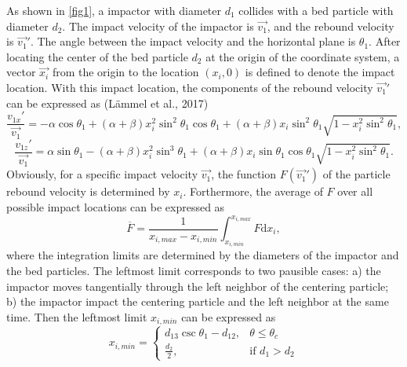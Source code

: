 \documentclass[12pt,a4paper]{article}
\newcommand{\diff}{\mathrm{d}} %
\begin{document}
As shown in \ref{fig1}, a impactor with diameter $d_1$ collides with a bed particle with diameter $d_2$. The impact velocity of the impactor is $\overrightarrow{v_1}$, and the rebound velocity is $\overrightarrow{v_1}'$. The angle between the impact velocity and the horizontal plane is $\theta_1$. After locating the center of the bed particle $d_2$ at the origin of the coordinate system, a vector $\overrightarrow{x_i}$ from the origin to the location $(x_i, 0)$ is defined to denote the impact location. With this impact location, the components of the rebound velocity $\overrightarrow{v_1}'$ can be expressed as (L\"ammel et al., 2017)
\begin{equation}
    \frac{v_{1x}'}{\overrightarrow{v_1}} = - \alpha \cos\theta_1 + (\alpha + \beta) x_i^2 \sin^2\theta_1\cos\theta_1 + (\alpha + \beta) x_i \sin^2\theta_1 \sqrt{1 - x_i^2\sin^2\theta_1}, \label{eq:v1x}
\end{equation}
\begin{equation}
    \frac{v_{1z}'}{\overrightarrow{v_1}} = \alpha \sin\theta_1 - (\alpha + \beta) x_i^2 \sin^3\theta_1 + (\alpha + \beta) x_i \sin\theta_1\cos\theta_1 \sqrt{1 - x_i^2\sin^2\theta_1}. \label{eq:v1z}
\end{equation}
Obviously, for a specific impact velocity $\overrightarrow{v_1}$, the function $F(\overrightarrow{v_1}')$ of the particle rebound velocity is determined by $x_i$. Forthermore, the average of $F$ over all possible impact locations can be expressed as
\begin{equation}
    \overline{F} = \frac{1}{x_{i, max} - x_{i, min}} \int_{x_{i,min}}^{x_{i,max}} F \diff x_i,
\end{equation}
where the integration limits are determined by the diameters of the impactor and the bed particles. The leftmost limit corresponds to two pausible cases: a) the impactor moves tangentially through the left neighbor of the centering particle; b) the impactor impact the centering particle and the left neighbor at the same time. Then the leftmost limit $x_{i,min}$ can be expressed as
\begin{equation}
    x_{i, min} = \begin{cases}
        d_{13}\csc\theta_1 - d_{12}, & \theta \leq \theta_c \\
        \frac{d_2}{2}, & \text{if } d_1 > d_2
    \end{cases}
\end{equation}
\end{document}
